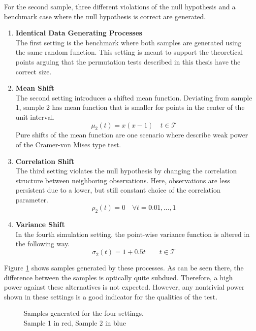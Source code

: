 \documentclass[12pt, a4paper]{article}
\theoremstyle{MAstyle} \newtheorem{assumption}{Assumption}[section]
\theoremstyle{MAstyle} \newtheorem{definition}{Definition}[section]
\theoremstyle{MAstyle} \newtheorem{theorem}{Theorem}[section]
\begin{document}
		For the second sample, three different violations of the null hypothesis and a benchmark case where the null hypothesis is correct are generated.
		\begin{enumerate}
			\item \textbf{Identical Data Generating Processes}\\
				  The first setting is the benchmark where both samples are generated using the same random function. This setting is meant to support the theoretical points arguing that the permutation tests described in this thesis have the correct size.
			\item \textbf{Mean Shift}\\
				  The second setting introduces a shifted mean function. Deviating from sample 1, sample 2 has mean function that is smaller for points in the center of the unit interval.
				  $$\mu_2(t) = x (x-1) \quad t \in \mathcal{T}$$
				  Pure shifts of the mean function are one scenario where \cite{bugni_permutation_2021} describe weak power of the Cramer-von Mises type test. 
			\newpage
			\item \textbf{Correlation Shift}\\
			 	  The third setting violates the null hypothesis by changing the correlation structure between neighboring observations. Here, observations are less persistent due to a lower, but still constant choice of the correlation parameter.
			 	  $$\rho_2(t) = 0 \quad \forall t = 0.01, \dots, 1$$
			\item \textbf{Variance Shift}\\
				  In the fourth simulation setting, the point-wise variance function is altered in the following way.
				  $$\sigma_2(t) = 1 + 0.5t \quad \quad t \in \mathcal{T}$$
		\end{enumerate}
	
		Figure \ref{settings} shows samples generated by these processes. As can be seen there, the difference between the samples is optically quite subdued. Therefore, a high power against these alternatives is not expected. However, any nontrivial power shown in these settings is a good indicator for the qualities of the test.
		\begin{figure}[H]
			\caption{Samples generated for the four settings. \\
			Sample 1 in red, Sample 2 in blue}
			\label{settings}
		\end{figure}
		
\end{document}
